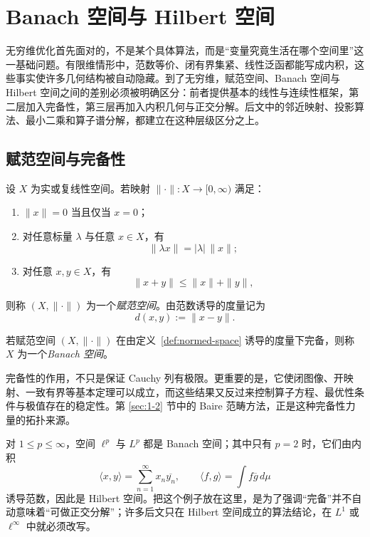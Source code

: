 \section{Banach 空间与 Hilbert 空间}

\label{sec:3-1}

无穷维优化首先面对的，不是某个具体算法，而是“变量究竟生活在哪个空间里”这一基础问题。有限维情形中，范数等价、闭有界集紧、线性泛函都能写成内积，这些事实使许多几何结构被自动隐藏。到了无穷维，赋范空间、Banach 空间与 Hilbert 空间之间的差别必须被明确区分：前者提供基本的线性与连续性框架，第二层加入完备性，第三层再加入内积几何与正交分解。后文中的邻近映射、投影算法、最小二乘和算子谱分解，都建立在这种层级区分之上。

\subsection{赋范空间与完备性}

\begin{definition}[赋范空间]\label{def:normed-space}
设 $X$ 为实或复线性空间。若映射 $\|\cdot\|\colon X\to [0,\infty)$ 满足：
\begin{enumerate}
  \item $\|x\|=0$ 当且仅当 $x=0$；
  \item 对任意标量 $\lambda$ 与任意 $x\in X$，有
  \[
  \|\lambda x\|=|\lambda|\,\|x\| ;
  \]
  \item 对任意 $x,y\in X$，有
  \[
  \|x+y\|\le \|x\|+\|y\| ,
  \]
\end{enumerate}
则称 $(X,\|\cdot\|)$ 为一个\emph{赋范空间}。由范数诱导的度量记为
\[
d(x,y):=\|x-y\|.
\]
\end{definition}

\begin{definition}[Banach 空间]\label{def:banach-space}
若赋范空间 $(X,\|\cdot\|)$ 在由定义~\ref{def:normed-space} 诱导的度量下完备，则称 $X$ 为一个\emph{Banach 空间}。
\end{definition}

完备性的作用，不只是保证 Cauchy 列有极限。更重要的是，它使闭图像、开映射、一致有界等基本定理可以成立，而这些结果又反过来控制算子方程、最优性条件与极值存在的稳定性。第 \ref{sec:1-2} 节中的 Baire 范畴方法，正是这种完备性力量的拓扑来源。

\begin{example}[函数空间的几何分层]\label{ex:lp-geometry}
对 $1\le p\le\infty$，空间 $\ell^p$ 与 $L^p$ 都是 Banach 空间；其中只有 $p=2$ 时，它们由内积
\[
\langle x,y\rangle=\sum_{n=1}^{\infty}x_n\overline{y_n},
\qquad
\langle f,g\rangle=\int f\overline{g}\,d\mu
\]
诱导范数，因此是 Hilbert 空间。把这个例子放在这里，是为了强调“完备”并不自动意味着“可做正交分解”；许多后文只在 Hilbert 空间成立的算法结论，在 $L^1$ 或 $\ell^\infty$ 中就必须改写。
\end{example}

